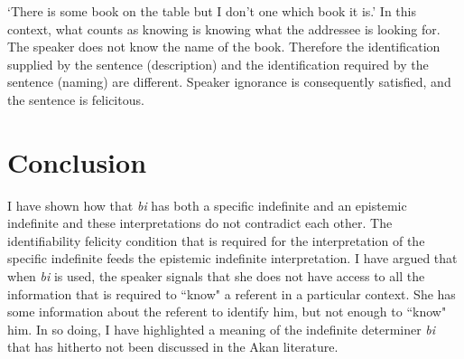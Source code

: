 \documentclass[output=paper,modfonts]{langsci/langscibook}
\begin{document}
\glt `There is some book on the table but I don't one which book it is.'
\z In this context, what counts as knowing is knowing what the addressee is looking for. The speaker does not know the name of the book. Therefore the identification supplied by the sentence (description) and the identification required by the sentence (naming) are different. Speaker ignorance is consequently satisfied, and the sentence is felicitous. 

\section{Conclusion}

I have shown how that \emph{bi} has both a  specific indefinite and an epistemic indefinite and these interpretations do not contradict each other. The identifiability felicity condition that is required for the interpretation of the specific indefinite feeds the epistemic indefinite interpretation. I have argued that when \emph{bi} is used, the speaker signals that she does not have access to all the information that is required to ``know" a referent in a particular context. She has some information about the referent to identify him, but not enough to ``know" him. In so doing, I have highlighted a meaning of the indefinite determiner \emph{bi} that has hitherto not been discussed in the Akan literature. 
 


\end{document}

